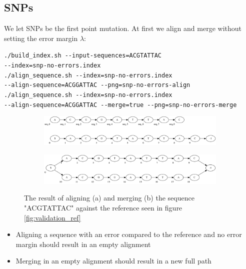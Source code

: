 \documentclass[thesis.tex]{subfiles}
\begin{document}
\subsection*{SNPs}
We let SNPs be the first point mutation. At first we align and merge without setting the error margin $\lambda$:\\
\par\noindent
\texttt{./build\_index.sh -{}-input-sequences=ACGTATTAC\\
-{}-index=snp-no-errors.index}\\
\texttt{./align\_sequence.sh -{}-index=snp-no-errors.index\\
-{}-align-sequence=ACGGATTAC -{}-png=snp-no-errors-align}\\
\texttt{./align\_sequence.sh -{}-index=snp-no-errors.index\\
-{}-align-sequence=ACGGATTAC -{}-merge=true -{}-png=snp-no-errors-merge}\\
\begin{figure}[!h]
  \begin{mdframed}
  \begin{subfigure}[t]{\textwidth}
      \includegraphics[width=\textwidth]{output/snp-no-errors-align.png}
    \subcaption{}
  \end{subfigure}
  \begin{subfigure}[t]{\textwidth}
      \includegraphics[width=\textwidth]{output/snp-no-errors-merge.png}
    \subcaption{}
  \end{subfigure}
  \end{mdframed}
  \caption{The result of aligning (a) and merging (b) the sequence "ACGTATTAC" against the reference seen in figure \ref{fig:validation_ref}}
  \label{fig:validation_snp_no_error}
\end{figure}
\begin{itemize}
\item Aligning a sequence with an error compared to the reference and no error margin should result in an empty alignment
\item Merging in an empty alignment should result in a new full path
\end{itemize}
\end{document}
